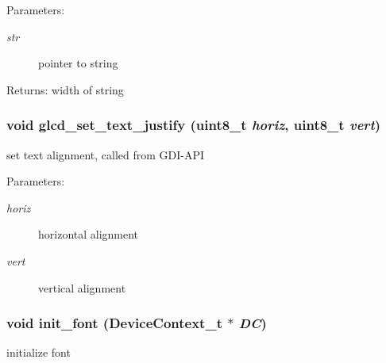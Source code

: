 \begin{Desc}
\item[Parameters:]
\begin{description}
\item[{\em str}]pointer to string \end{description}
\end{Desc}
\begin{Desc}
\item[Returns:]width of string \end{Desc}
\hypertarget{group__graphic__device__font_g526db8c9babc556c5a4cc0fca4375b57}{
\subsubsection[{glcd\_\-set\_\-text\_\-justify}]{\setlength{\rightskip}{0pt plus 5cm}void glcd\_\-set\_\-text\_\-justify (uint8\_\-t {\em horiz}, \/  uint8\_\-t {\em vert})}}
\label{group__graphic__device__font_g526db8c9babc556c5a4cc0fca4375b57}


set text alignment, called from GDI-API 

\begin{Desc}
\item[Parameters:]
\begin{description}
\item[{\em horiz}]horizontal alignment \item[{\em vert}]vertical alignment \end{description}
\end{Desc}
\hypertarget{group__graphic__device__font_ga343406213368d6304b31a9fce39c19d}{
\subsubsection[{init\_\-font}]{\setlength{\rightskip}{0pt plus 5cm}void init\_\-font ({\bf DeviceContext\_\-t} $\ast$ {\em DC})}}
\label{group__graphic__device__font_ga343406213368d6304b31a9fce39c19d}


initialize font 

